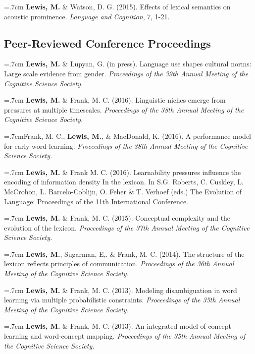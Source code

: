 \documentclass[letterpaper]{article}
\begin{document}
  \hangindent=.7cm {\bf Lewis, M.} \& Watson, D. G. (2015). Effects of lexical semantics on acoustic prominence. { \it Language and Cognition}, 7, 1-21. 

  
  \subsection*{Peer-Reviewed Conference Proceedings} 
    \hangindent=.7cm {\bf Lewis, M.} \& Lupyan, G. (in press). Language use shapes cultural norms: Large scale evidence from gender.  { \it Proceedings of the 39th Annual Meeting of the Cognitive Science Society.}

  \hangindent=.7cm {\bf Lewis, M.} \& Frank, M. C. (2016). Linguistic niches emerge from pressures at multiple timescales. { \it Proceedings of the 38th Annual Meeting of the Cognitive Science Society.}

   \hangindent=.7cmFrank, M. C.,  {\bf Lewis, M.}, \& MacDonald, K. (2016). A performance model for early word learning.  { \it Proceedings of the 38th Annual Meeting of the Cognitive Science Society.}

  \hangindent=.7cm {\bf Lewis, M.} \& Frank M. C. (2016). Learnability pressures influence the encoding of information density In the lexicon. In S.G. Roberts, C. Cuskley, L. McCrohon, L. Barcelo-Coblijn, O. Feher \& T. Verhoef (eds.) The Evolution of Language: Proceedings of the 11th International Conference.


 \hangindent=.7cm {\bf Lewis, M.} \& Frank, M. C. (2015). Conceptual complexity and the evolution of the lexicon. { \it Proceedings of the 37th Annual Meeting of the Cognitive Science Society.}
 
 \hangindent=.7cm {\bf Lewis, M.}, Sugarman, E,. \& Frank, M. C. (2014). The structure of the lexicon reflects principles of communication. { \it Proceedings of the 36th Annual Meeting of the Cognitive Science Society.}
  
 \hangindent=.7cm {\bf Lewis, M.} \& Frank, M. C. (2013). Modeling disambiguation in word learning via multiple probabilistic constraints. { \it Proceedings of the 35th Annual Meeting of the Cognitive Science Society.}

 \hangindent=.7cm {\bf Lewis, M.} \& Frank, M. C. (2013). An integrated model of concept learning and word-concept mapping.{ \it Proceedings of the 35th Annual Meeting of the Cognitive Science Society.}
 
 \singlespacing
 
\end{document}
